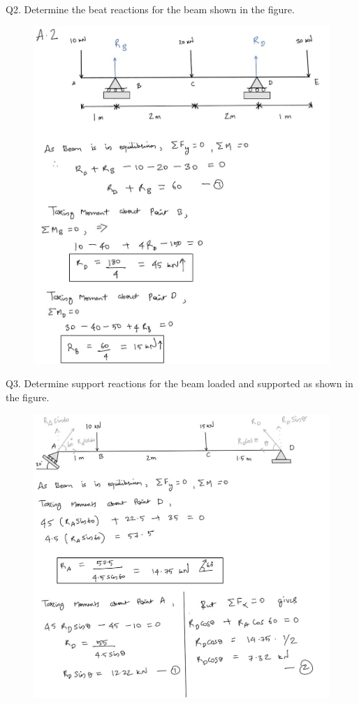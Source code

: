 \documentclass[11pt]{article}
\begin{document}
\pagebreak
Q2. Determine the beat reactions for the beam shown in the figure. 
\begin{figure}[H]
	\includegraphics[scale=0.45]{a2.jpg}
	\label{fig: Polygon Law}
\end{figure}
\pagebreak

Q3. Determine support reactions for the beam loaded and supported as shown in the figure.
\begin{figure}[H]
	\includegraphics[scale=0.5]{a31.jpg}
	\label{fig: Polygon Law}
\end{figure}
\end{document}
